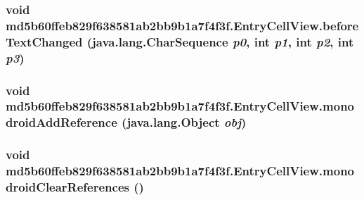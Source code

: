\hypertarget{classmd5b60ffeb829f638581ab2bb9b1a7f4f3f_1_1_entry_cell_view_cfae287696d61b422c2c4a85025777da}{
\subsubsection[{beforeTextChanged}]{\setlength{\rightskip}{0pt plus 5cm}void md5b60ffeb829f638581ab2bb9b1a7f4f3f.EntryCellView.beforeTextChanged (java.lang.CharSequence {\em p0}, \/  int {\em p1}, \/  int {\em p2}, \/  int {\em p3})}}
\label{classmd5b60ffeb829f638581ab2bb9b1a7f4f3f_1_1_entry_cell_view_cfae287696d61b422c2c4a85025777da}


\hypertarget{classmd5b60ffeb829f638581ab2bb9b1a7f4f3f_1_1_entry_cell_view_8aa0a5d92b90e3037d35cce81ecf8b6b}{
\subsubsection[{monodroidAddReference}]{\setlength{\rightskip}{0pt plus 5cm}void md5b60ffeb829f638581ab2bb9b1a7f4f3f.EntryCellView.monodroidAddReference (java.lang.Object {\em obj})}}
\label{classmd5b60ffeb829f638581ab2bb9b1a7f4f3f_1_1_entry_cell_view_8aa0a5d92b90e3037d35cce81ecf8b6b}


\hypertarget{classmd5b60ffeb829f638581ab2bb9b1a7f4f3f_1_1_entry_cell_view_8bc0e236db435f7673b1350dca4cb844}{
\subsubsection[{monodroidClearReferences}]{\setlength{\rightskip}{0pt plus 5cm}void md5b60ffeb829f638581ab2bb9b1a7f4f3f.EntryCellView.monodroidClearReferences ()}}
\label{classmd5b60ffeb829f638581ab2bb9b1a7f4f3f_1_1_entry_cell_view_8bc0e236db435f7673b1350dca4cb844}


